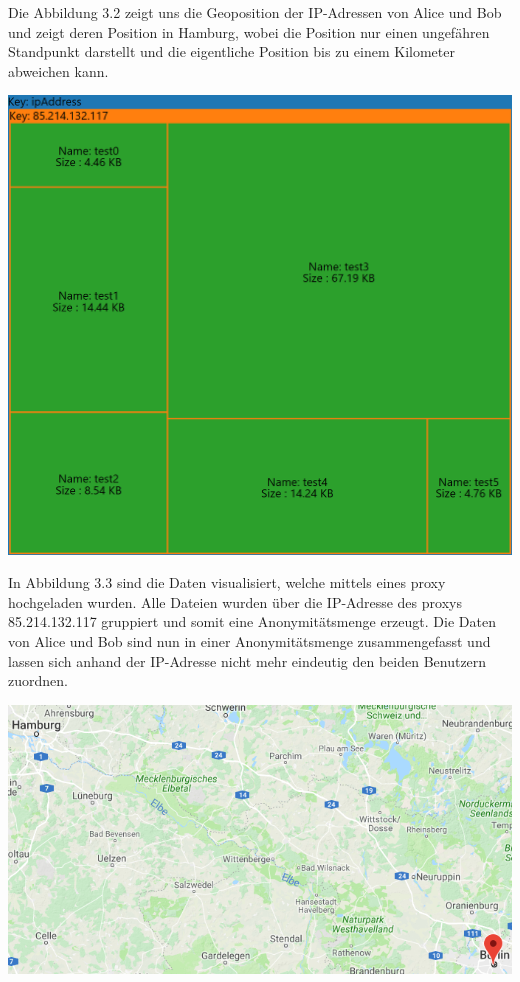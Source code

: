 \documentclass[
    fontsize=12pt,
    headings=small,
    parskip=half,           %
    bibliography=totoc,
    numbers=noenddot,       %
    open=any,               %
    ]{scrreprt}
\begin{document}
Die Abbildung 3.2 zeigt uns die Geoposition der IP-Adressen von Alice und Bob und zeigt deren Position in Hamburg, 
wobei die Position nur einen ungefähren Standpunkt darstellt und die eigentliche Position bis zu einem Kilometer abweichen kann.

\begin{center}
\includegraphics[width=\textwidth]{../pic/IP-Proxy-SetB-tree2.png}\\
\end{center}

In Abbildung 3.3 sind die Daten visualisiert, welche mittels eines proxy hochgeladen wurden. 
Alle Dateien wurden über die IP-Adresse des proxys 85.214.132.117 gruppiert und somit eine Anonymitätsmenge erzeugt.
Die Daten von Alice und Bob sind nun in einer Anonymitätsmenge zusammengefasst und lassen sich anhand der IP-Adresse nicht mehr eindeutig den beiden Benutzern zuordnen.

\begin{center}
\includegraphics[width=\textwidth]{../pic/IP-Proxy-SetB.png}\\
\end{center}
\end{document}
